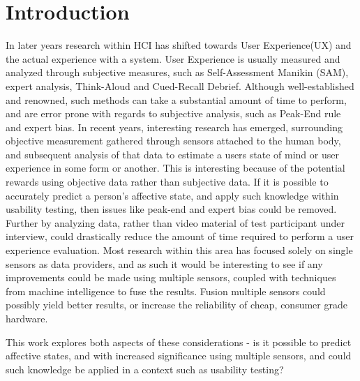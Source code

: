 \chapter{Introduction}
In later years research within HCI has shifted towards User Experience(UX) and the actual experience with a system.
User Experience is usually measured and analyzed through subjective measures, such as Self-Assessment Manikin (SAM), expert analysis, Think-Aloud and Cued-Recall Debrief.
Although well-established and renowned, such methods can take a substantial amount of time to perform, and are error prone with regards to subjective analysis, such as Peak-End rule and expert bias.
In recent years, interesting research has emerged, surrounding objective measurement gathered through sensors attached to the human body, and subsequent analysis of that data to estimate a users state of mind or user experience in some form or another.
This is interesting because of the potential rewards using objective data rather than subjective data.
If it is possible to accurately predict a person's affective state, and apply such knowledge within usability testing, then issues like peak-end and expert bias could be removed.
Further by analyzing data, rather than video material of test participant under interview, could drastically reduce the amount of time required to perform a user experience evaluation.
Most research within this area has focused solely on single sensors as data providers, and as such it would be
interesting to see if any improvements could be made using multiple sensors, coupled with techniques from machine intelligence to fuse the results.
Fusion multiple sensors could possibly yield better results, or increase the reliability of cheap, consumer grade hardware.

This work explores both aspects of these considerations - is it possible to predict affective states, and with increased
significance using multiple sensors, and could such knowledge be applied in a context such as usability testing?

